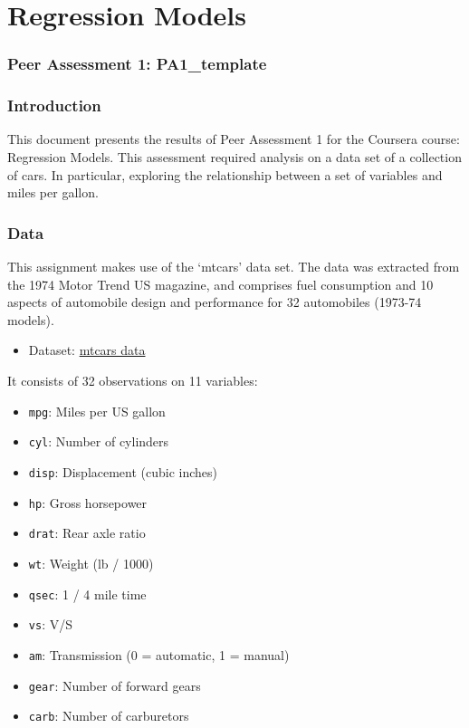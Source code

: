 \documentclass[]{article}
\title{}
\author{}
\date{}
\begin{document}
\maketitle


\section{Regression Models}\label{regression-models}

\subsubsection{Peer Assessment 1:
PA1\_template}\label{peer-assessment-1-pa1ux5ftemplate}

\subsubsection{Introduction}\label{introduction}

This document presents the results of Peer Assessment 1 for the Coursera
course: Regression Models. This assessment required analysis on a data
set of a collection of cars. In particular, exploring the relationship
between a set of variables and miles per gallon.

\subsubsection{Data}\label{data}

This assignment makes use of the `mtcars' data set. The data was
extracted from the 1974 Motor Trend US magazine, and comprises fuel
consumption and 10 aspects of automobile design and performance for 32
automobiles (1973-74 models).

\begin{itemize}
\itemsep1pt\parskip0pt
\item
  Dataset:
  \href{https://stat.ethz.ch/R-manual/R-devel/library/datasets/html/mtcars.html}{mtcars
  data}
\end{itemize}

It consists of 32 observations on 11 variables:

\begin{itemize}
\itemsep1pt\parskip0pt
\item
  \texttt{mpg}: Miles per US gallon
\item
  \texttt{cyl}: Number of cylinders
\item
  \texttt{disp}: Displacement (cubic inches)
\item
  \texttt{hp}: Gross horsepower
\item
  \texttt{drat}: Rear axle ratio
\item
  \texttt{wt}: Weight (lb / 1000)
\item
  \texttt{qsec}: 1 / 4 mile time
\item
  \texttt{vs}: V/S
\item
  \texttt{am}: Transmission (0 = automatic, 1 = manual)
\item
  \texttt{gear}: Number of forward gears
\item
  \texttt{carb}: Number of carburetors
\end{itemize}
\end{document}
